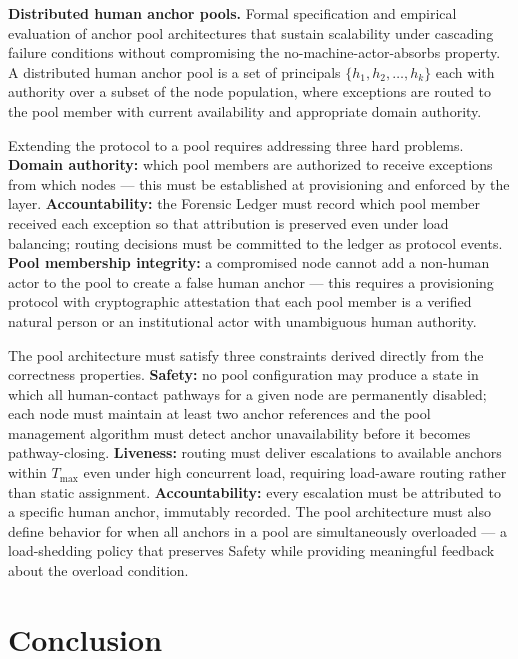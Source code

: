 \medskip\noindent\textbf{Distributed human anchor pools.} Formal specification and empirical evaluation of anchor pool architectures that sustain scalability under cascading failure conditions without compromising the no-machine-actor-absorbs property. A distributed human anchor pool is a set of principals $\{h_1, h_2, \ldots, h_k\}$ each with authority over a subset of the node population, where exceptions are routed to the pool member with current availability and appropriate domain authority.

Extending the protocol to a pool requires addressing three hard problems. \textbf{Domain authority:} which pool members are authorized to receive exceptions from which nodes — this must be established at provisioning and enforced by the \fact{} layer. \textbf{Accountability:} the Forensic Ledger must record which pool member received each exception so that attribution is preserved even under load balancing; routing decisions must be committed to the ledger as protocol events. \textbf{Pool membership integrity:} a compromised node cannot add a non-human actor to the pool to create a false human anchor — this requires a provisioning protocol with cryptographic attestation that each pool member is a verified natural person or an institutional actor with unambiguous human authority.

The pool architecture must satisfy three constraints derived directly from the correctness properties. \textbf{Safety:} no pool configuration may produce a state in which all human-contact pathways for a given node are permanently disabled; each node must maintain at least two anchor references and the pool management algorithm must detect anchor unavailability before it becomes pathway-closing. \textbf{Liveness:} routing must deliver escalations to available anchors within $T_{\max}$ even under high concurrent load, requiring load-aware routing rather than static assignment. \textbf{Accountability:} every escalation must be attributed to a specific human anchor, immutably recorded. The pool architecture must also define behavior for when all anchors in a pool are simultaneously overloaded — a load-shedding policy that preserves Safety while providing meaningful feedback about the overload condition.

\section{Conclusion}
\label{sec:conclusion}

